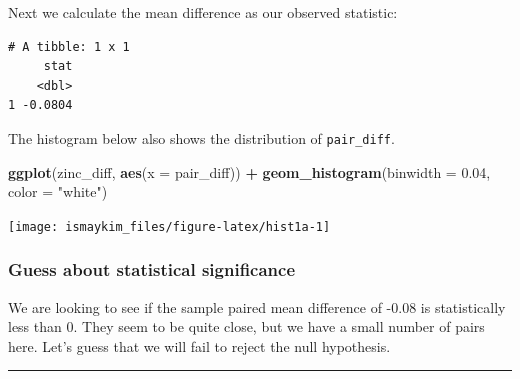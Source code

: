 \documentclass[12pt, krantz2,]{krantz}
\makeatletter
\newenvironment{Shaded}{\begin{snugshade}}{\end{snugshade}}
\newcommand{\DataTypeTok}[1]{\textcolor[rgb]{0.27,0.27,0.27}{#1}}
\newcommand{\FloatTok}[1]{\textcolor[rgb]{0.06,0.06,0.06}{#1}}
\newcommand{\KeywordTok}[1]{\textcolor[rgb]{0.27,0.27,0.27}{\textbf{#1}}}
\newcommand{\NormalTok}[1]{#1}
\newcommand{\OperatorTok}[1]{\textcolor[rgb]{0.43,0.43,0.43}{\textbf{#1}}}
\newcommand{\StringTok}[1]{\textcolor[rgb]{0.5,0.5,0.5}{#1}}
\newenvironment{kframe}{%
\medskip{}
\setlength{\fboxsep}{.8em}
 \def\at@end@of@kframe{}%
 \ifinner\ifhmode%
  \def\at@end@of@kframe{\end{minipage}}%
  \begin{minipage}{\columnwidth}%
 \fi\fi%
 \def\FrameCommand##1{\hskip\@totalleftmargin \hskip-\fboxsep
 \colorbox{shadecolor}{##1}\hskip-\fboxsep
     \hskip-\linewidth \hskip-\@totalleftmargin \hskip\columnwidth}%
 \MakeFramed {\advance\hsize-\width
   \@totalleftmargin\z@ \linewidth\hsize
   \@setminipage}}%
 {\par\unskip\endMakeFramed%
 \at@end@of@kframe}
\renewenvironment{Shaded}{\begin{kframe}}{\end{kframe}}
\makeatother
\begin{document}
Next we calculate the mean difference as our observed statistic:

\begin{Shaded}
\end{Shaded}

\begin{verbatim}
# A tibble: 1 x 1
     stat
    <dbl>
1 -0.0804
\end{verbatim}

The histogram below also shows the distribution of \texttt{pair\_diff}.

\begin{Shaded}
\begin{Highlighting}[]
\KeywordTok{ggplot}\NormalTok{(zinc_diff, }\KeywordTok{aes}\NormalTok{(}\DataTypeTok{x =}\NormalTok{ pair_diff)) }\OperatorTok{+}
\StringTok{  }\KeywordTok{geom_histogram}\NormalTok{(}\DataTypeTok{binwidth =} \FloatTok{0.04}\NormalTok{, }\DataTypeTok{color =} \StringTok{"white"}\NormalTok{)}
\end{Highlighting}
\end{Shaded}

\begin{center}\texttt{[image: ismaykim\_files/figure-latex/hist1a-1]} \end{center}

\hypertarget{guess-about-statistical-significance-4}{%
\subsubsection*{Guess about statistical significance}\label{guess-about-statistical-significance-4}}


We are looking to see if the sample paired mean difference of -0.08 is statistically less than 0. They seem to be quite close, but we have a small number of pairs here. Let's guess that we will fail to reject the null hypothesis.

\begin{center}\rule{0.5\linewidth}{\linethickness}\end{center}
\end{document}
